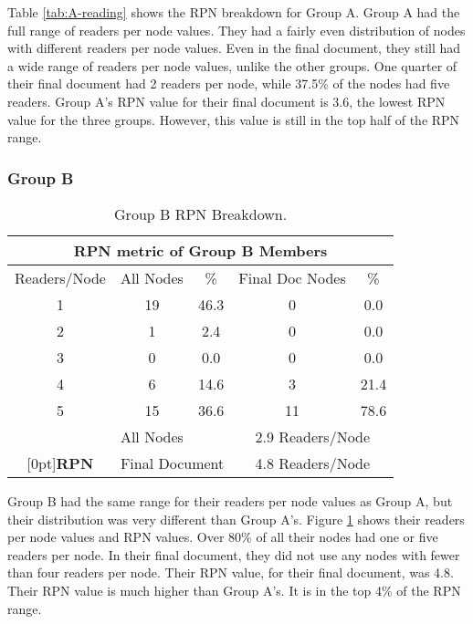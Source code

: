 Table \ref{tab:A-reading} shows the RPN breakdown for Group A.  Group
A had the full range of readers per node values.  They had a fairly even
distribution of nodes with different readers per node values.  Even in the
final document, they still had a wide range of readers per node values,
unlike the other groups.  One quarter of their final document had 2 readers
per node, while 37.5\% of the nodes had five readers.  Group A's RPN
value for their final document is 3.6, the lowest RPN value for the three
groups.  However, this value is still in the top half of the RPN range.

\subsubsection{Group B}

\small
\begin{table}[htbp]
  \caption{Group B RPN Breakdown.}
  \begin{center}
    \begin{tabular}{|c|c|c|c|c|}
      \hline
      \multicolumn{5}{|c|}{\rule[-3mm]{0mm}{8mm}\bf RPN metric of Group B
      Members}\\  
      \hline
      Readers/Node&All Nodes&\%&Final Doc Nodes&\%\\ \hline
      \hline
      1&19&46.3&0&0.0\\ \hline
      2&1&2.4&0&0.0\\ \hline
      3&0&0.0&0&0.0\\ \hline
      4&6&14.6&3&21.4\\\hline 
      5&15&36.6&11&78.6\\\hline
      \hline
      &\multicolumn{2}{|l|}{All Nodes}&\multicolumn{2}{|c|}{2.9
      Readers/Node}\\ \cline{2-5} 
      \raisebox{1.5ex}[0pt]{\bf RPN}&\multicolumn{2}{|l|}{Final
      Document}&\multicolumn{2}{|c|}{4.8 Readers/Node}\\\hline
    \end{tabular}
  \end{center}
  \label{tab:Ku-reading}
\end{table}
\normalsize

Group B had the same range for their readers per node values as
Group A, but their distribution was very different than Group A's.  Figure
\ref{tab:Ku-reading} shows their readers per node values and RPN values.
Over 80\% of all their nodes had one or five readers per node.  In their
final document, they did not use any nodes with fewer than four readers per
node.  Their RPN value, for their final document, was 4.8.  Their RPN value
is much higher than Group A's. It is in the top 4\% of the RPN range.

